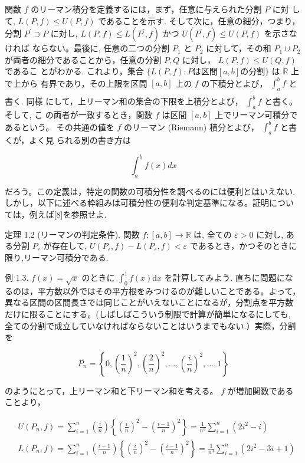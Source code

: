 \documentclass[14pt]{jsarticle}
\begin{document}
関数 $f$ のリーマン積分を定義するには，まず，任意に与えられた分割 $P$ に対 して, $L(P, f) \leq U(P, f)$ であることを示す. そして次に，任意の細分，つまり，分割 $P^{\prime} \supset P$ に対し, $L(P, f) \leq L\left(P^{\prime}, f\right)$ かつ $U\left(P^{\prime}, f\right) \leq U(P, f)$ を示さなければ ならない。最後に, 任意の二つの分割 $P_{1}$ と $P_{2}$ に対して，その和 $P_{1} \cup P_{2}$ が両者の細分であることから，任意の分割 $P, Q$ に対し， $L(P, f) \leq U(Q, f)$ であるこ とがわかる. これより，集合 $\{L(P, f) : P \text{は区間} [a, b] \text{の分割} \}$ は $\mathbb{R}$ 上で上から 有界であり，その上限を区間 $[a, b]$ 上の $f$ の下積分とよび， $\int_{a}^{b} f$ と書く. 同様 にして，上リーマン和の集合の下限を上積分とよび， $\overline{\int_{a}^{b}} f$ と書く。そして, こ の両者が一致するとき，関数 $f$ は区間 $[a, b]$ 上でリーマン可積分であるという。 その共通の値を $f$ のリーマン (Riemann) 積分とよび， $\int_{a}^{b} f$ と書くが，よく見 られる別の書き方は

$$
\int_{a}^{b} f(x) d x
$$

だろう。この定義は，特定の関数の可積分性を調べるのには便利とはいえない. しかし，以下に述べる枠組みは可積分性の便利な判定基準になる。証明につい ては，例えば[8]を参照せよ.

定理 1.2 (リーマンの判定条件). 関数 $f:[a, b] \rightarrow \mathbb{R}$ は, 全ての $\varepsilon>0$ に対し, ある分割 $P_{\varepsilon}$ が存在して, $U\left(P_{\varepsilon}, f\right)-L\left(P_{\varepsilon}, f\right)<\varepsilon$ であるとき，かつそのときに 限り,リーマン可積分である.

例 1.3. $f(x)=\sqrt{x}$ のときに $\int_{0}^{1} f(x) \mathrm{d} x$ を計算してみよう. 直ちに問題にな るのは，平方数以外ではその平方根をみつけるのが難しいことである。よって，異なる区間の区間長さでは同じことがいえないことになるが，分割点を平方数 だけに限ることにする。(しばしばこういう制限で計算が簡単になるにしても,\\
全ての分割で成立していなければならないことはいうまでもない.）実際，分割を

$$
P_{n}=\left\{0,\left(\frac{1}{n}\right)^{2},\left(\frac{2}{n}\right)^{2}, \ldots,\left(\frac{i}{n}\right)^{2}, \ldots, 1\right\}
$$

のようにとって，上リーマン和と下リーマン和を考える。 $f$ が増加関数である ことより，

$$
\begin{aligned}
& U\left(P_{n}, f\right)=\sum_{i=1}^{n}\left(\frac{i}{n}\right)\left\{\left(\frac{i}{n}\right)^{2}-\left(\frac{i-1}{n}\right)^{2}\right\}=\frac{1}{n^{3}} \sum_{i=1}^{n}\left(2 i^{2}-i\right) \\
& L\left(P_{n}, f\right)=\sum_{i=1}^{n}\left(\frac{i-1}{n}\right)\left\{\left(\frac{i}{n}\right)^{2}-\left(\frac{i-1}{n}\right)^{2}\right\}=\frac{1}{n^{3}} \sum_{i=1}^{n}\left(2 i^{2}-3 i+1\right)
\end{aligned}
$$
\end{document}
